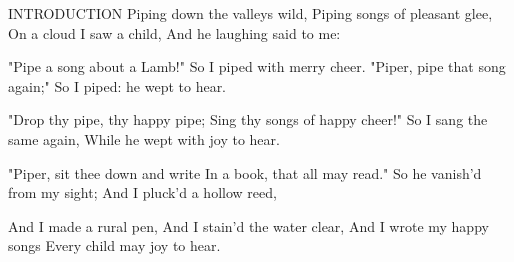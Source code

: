 INTRODUCTION
Piping down the valleys wild,
     Piping songs of pleasant glee,
   On a cloud I saw a child,
     And he laughing said to me:

   "Pipe a song about a Lamb!"
     So I piped with merry cheer.
   "Piper, pipe that song again;"
     So I piped: he wept to hear.

   "Drop thy pipe, thy happy pipe;
     Sing thy songs of happy cheer!"
   So I sang the same again,
     While he wept with joy to hear.

   "Piper, sit thee down and write
     In a book, that all may read."
   So he vanish'd from my sight;
     And I pluck'd a hollow reed,
     
   And I made a rural pen,
     And I stain'd the water clear,
   And I wrote my happy songs
     Every child may joy to hear.